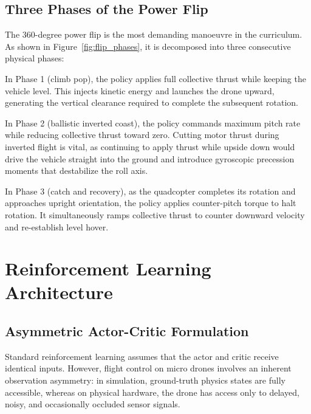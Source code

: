 \documentclass[11pt,a4paper]{article}
\begin{document}
\subsection{Three Phases of the Power Flip}
The 360-degree power flip is the most demanding manoeuvre in the curriculum. As shown in Figure~\ref{fig:flip_phases}, it is decomposed into three consecutive physical phases:

In Phase 1 (climb pop), the policy applies full collective thrust while keeping the vehicle level. This injects kinetic energy and launches the drone upward, generating the vertical clearance required to complete the subsequent rotation.

In Phase 2 (ballistic inverted coast), the policy commands maximum pitch rate while reducing collective thrust toward zero. Cutting motor thrust during inverted flight is vital, as continuing to apply thrust while upside down would drive the vehicle straight into the ground and introduce gyroscopic precession moments that destabilize the roll axis.

In Phase 3 (catch and recovery), as the quadcopter completes its rotation and approaches upright orientation, the policy applies counter-pitch torque to halt rotation. It simultaneously ramps collective thrust to counter downward velocity and re-establish level hover.

\section{Reinforcement Learning Architecture}
\label{sec:learning}

\subsection{Asymmetric Actor-Critic Formulation}
Standard reinforcement learning assumes that the actor and critic receive identical inputs. However, flight control on micro drones involves an inherent observation asymmetry: in simulation, ground-truth physics states are fully accessible, whereas on physical hardware, the drone has access only to delayed, noisy, and occasionally occluded sensor signals.
\end{document}
